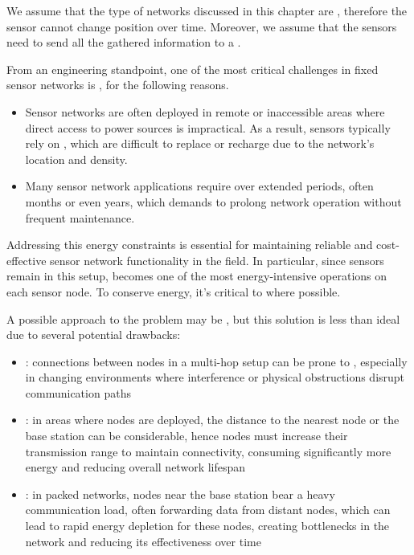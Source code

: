\documentclass[a4paper, 12pt]{report}
\begin{document}
    We assume that the type of networks discussed in this chapter are , therefore the sensor cannot change position over time. Moreover, we assume that the sensors need to send all the gathered information to a .
    
    From an engineering standpoint, one of the most critical challenges in fixed sensor networks is , for the following reasons.

    \begin{itemize}
        \item Sensor networks are often deployed in remote or inaccessible areas where direct access to power sources is impractical. As a result, sensors typically rely on , which are difficult to replace or recharge due to the network's location and density.
        \item Many sensor network applications require  over extended periods, often months or even years, which demands  to prolong network operation without frequent maintenance.
    \end{itemize}

     Addressing this energy constraints is essential for maintaining reliable and cost-effective sensor network functionality in the field. In particular, since sensors remain  in this setup,  becomes one of the most energy-intensive operations on each sensor node. To conserve energy, it's critical to  where possible.

     A possible approach to the problem may be , but this solution is less than ideal due to several potential drawbacks:

    \begin{itemize}
        \item {}: connections between nodes in a multi-hop setup can be prone to , especially in changing environments where interference or physical obstructions disrupt communication paths
        \item {}: in areas where nodes are  deployed, the distance to the nearest node or the base station can be considerable, hence nodes must increase their transmission range to maintain connectivity, consuming significantly more energy and reducing overall network lifespan
        \item {}: in  packed networks, nodes near the base station bear a heavy communication load, often forwarding data from distant nodes, which can lead to rapid energy depletion for these nodes, creating bottlenecks in the network and reducing its effectiveness over time
    \end{itemize}
\end{document}
